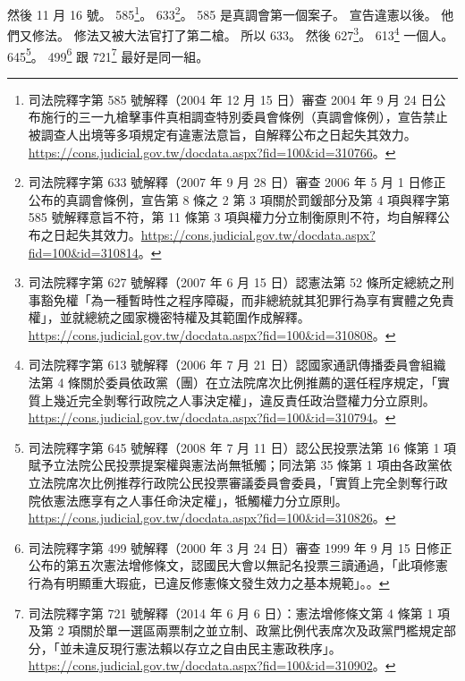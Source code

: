 \hypertarget{c01:cue:1546}{}然後 11 月 16 號。
\hypertarget{c01:cue:1547}{}585\footnote{司法院釋字第 585 號解釋（2004 年 12 月 15 日）審查 2004 年 9 月 24 日公布施行的三一九槍擊事件真相調查特別委員會條例（真調會條例），宣告禁止被調查人出境等多項規定有違憲法意旨，自解釋公布之日起失其效力。\url{https://cons.judicial.gov.tw/docdata.aspx?fid=100&id=310766}。}。
\hypertarget{c01:cue:1548}{}633\footnote{司法院釋字第 633 號解釋（2007 年 9 月 28 日）審查 2006 年 5 月 1 日修正公布的真調會條例，宣告第 8 條之 2 第 3 項關於罰鍰部分及第 4 項與釋字第 585 號解釋意旨不符，第 11 條第 3 項與權力分立制衡原則不符，均自解釋公布之日起失其效力。\url{https://cons.judicial.gov.tw/docdata.aspx?fid=100&id=310814}。}。
\hypertarget{c01:cue:1549}{}585 是真調會第一個案子。
\hypertarget{c01:cue:1550}{}宣告違憲以後。
\hypertarget{c01:cue:1551}{}他們又修法。
\hypertarget{c01:cue:1552}{}修法又被大法官打了第二槍。
\hypertarget{c01:cue:1553}{}所以 633。
\hypertarget{c01:cue:1554}{}然後 627\footnote{司法院釋字第 627 號解釋（2007 年 6 月 15 日）認憲法第 52 條所定總統之刑事豁免權「為一種暫時性之程序障礙，而非總統就其犯罪行為享有實體之免責權」，並就總統之國家機密特權及其範圍作成解釋。\url{https://cons.judicial.gov.tw/docdata.aspx?fid=100&id=310808}。}。
\hypertarget{c01:cue:1555}{}613\footnote{司法院釋字第 613 號解釋（2006 年 7 月 21 日）認國家通訊傳播委員會組織法第 4 條關於委員依政黨（團）在立法院席次比例推薦的選任程序規定，「實質上幾近完全剝奪行政院之人事決定權」，違反責任政治暨權力分立原則。\url{https://cons.judicial.gov.tw/docdata.aspx?fid=100&id=310794}。} 一個人。
\hypertarget{c01:cue:1556}{}645\footnote{司法院釋字第 645 號解釋（2008 年 7 月 11 日）認公民投票法第 16 條第 1 項賦予立法院公民投票提案權與憲法尚無牴觸；同法第 35 條第 1 項由各政黨依立法院席次比例推荐行政院公民投票審議委員會委員，「實質上完全剝奪行政院依憲法應享有之人事任命決定權」，牴觸權力分立原則。\url{https://cons.judicial.gov.tw/docdata.aspx?fid=100&id=310826}。}。
\hypertarget{c01:cue:1557}{}499\footnote{司法院釋字第 499 號解釋（2000 年 3 月 24 日）審查 1999 年 9 月 15 日修正公布的第五次憲法增修條文，認國民大會以無記名投票三讀通過，「此項修憲行為有明顯重大瑕疵，已違反修憲條文發生效力之基本規範」。\cite{jy499}。} 跟 721\footnote{司法院釋字第 721 號解釋（2014 年 6 月 6 日）：憲法增修條文第 4 條第 1 項及第 2 項關於單一選區兩票制之並立制、政黨比例代表席次及政黨門檻規定部分，「並未違反現行憲法賴以存立之自由民主憲政秩序」。\url{https://cons.judicial.gov.tw/docdata.aspx?fid=100&id=310902}。} 最好是同一組。
